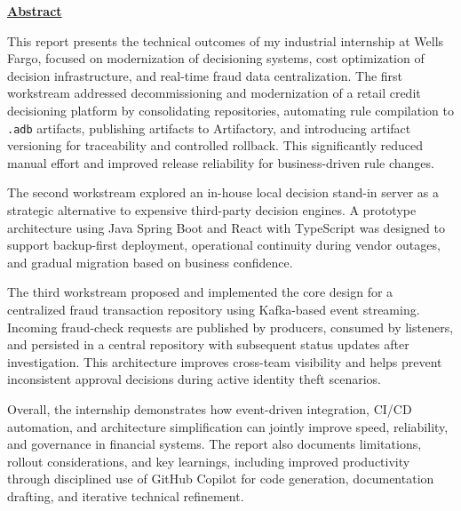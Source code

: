 \newpage
\begin{center}
	\textbf{\Huge \underline{Abstract}} \\[1.5cm]	
\end{center}

This report presents the technical outcomes of my industrial internship at Wells Fargo, focused on modernization of decisioning systems, cost optimization of decision infrastructure, and real-time fraud data centralization. The first workstream addressed decommissioning and modernization of a retail credit decisioning platform by consolidating repositories, automating rule compilation to \texttt{.adb} artifacts, publishing artifacts to Artifactory, and introducing artifact versioning for traceability and controlled rollback. This significantly reduced manual effort and improved release reliability for business-driven rule changes.

The second workstream explored an in-house local decision stand-in server as a strategic alternative to expensive third-party decision engines. A prototype architecture using Java Spring Boot and React with TypeScript was designed to support backup-first deployment, operational continuity during vendor outages, and gradual migration based on business confidence.

The third workstream proposed and implemented the core design for a centralized fraud transaction repository using Kafka-based event streaming. Incoming fraud-check requests are published by producers, consumed by listeners, and persisted in a central repository with subsequent status updates after investigation. This architecture improves cross-team visibility and helps prevent inconsistent approval decisions during active identity theft scenarios.

Overall, the internship demonstrates how event-driven integration, CI/CD automation, and architecture simplification can jointly improve speed, reliability, and governance in financial systems. The report also documents limitations, rollout considerations, and key learnings, including improved productivity through disciplined use of GitHub Copilot for code generation, documentation drafting, and iterative technical refinement.
